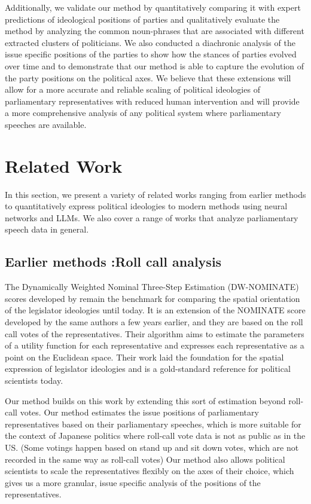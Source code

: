 \documentclass[final,5p,times,twocolumn,authoryear]{elsarticle}
\begin{document}
Additionally, we validate our method by quantitatively comparing it with expert predictions of ideological positions of parties and qualitatively evaluate the method by analyzing the common noun-phrases that are associated with different extracted clusters of politicians. We also conducted a diachronic analysis of the issue specific positions of the parties to show how the stances of parties evolved over time and to demonstrate that our method is able to capture the evolution of the party positions on the political axes.
We believe that these extensions will allow for a more accurate and reliable scaling of political ideologies of parliamentary representatives with reduced human intervention and will provide a more comprehensive analysis of any political system where parliamentary speeches are available.




\section{Related Work}
In this section, we present a variety of related works ranging from earlier methods to quantitatively express political ideologies to modern methods using neural networks and LLMs. We also cover a range of works that analyze parliamentary speech data in general.

\subsection{Earlier methods :Roll call analysis}

The Dynamically Weighted Nominal Three-Step Estimation (DW-NOMINATE) scores developed by \citeauthor{dw-nominate} remain the benchmark for comparing the spatial orientation of the legislator ideologies until today. It is an extension of the NOMINATE score \citep{spatial-model-for-legislative-roll-call} developed by the same authors a few years earlier, and they are based on the roll call votes of the representatives. Their algorithm aims to estimate the parameters of a utility function for each representative and expresses each representative as a point on the Euclidean space. Their work laid the foundation for the spatial expression of legislator ideologies and is a gold-standard reference for political scientists today.

Our method builds on this work by extending this sort of estimation beyond roll-call votes. Our method estimates the issue positions of parliamentary representatives based on their parliamentary speeches, which is more suitable for the context of Japanese politics where roll-call vote data is not as public as in the US. (Some votings happen based on stand up and sit down votes, which are not recorded in the same way as roll-call votes) Our method also allows political scientists to scale the representatives flexibly on the axes of their choice, which gives us a more granular, issue specific analysis of the positions of the representatives. 
\end{document}
